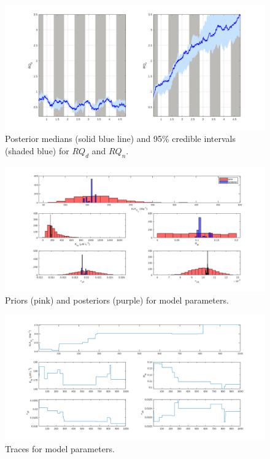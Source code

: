 \documentclass{ruthesis}
\begin{document}
\begin{figure}
	\centerline{\includegraphics[width=1.2\textwidth]{images_microalgae/plots_chris_offset_sigma/RQ_d_RQ_n}}
	\caption[.]{Posterior medians (solid blue line) and 95\% credible intervals (shaded blue) for $RQ_d$ and $RQ_n$.}
	\label{fig:micro_exp_offset_sigma_RQ_d_RQ_n}
\end{figure}



\begin{figure}
	\centerline{\includegraphics[width=1.3\textwidth]{images_microalgae/plots_chris_offset_sigma/modelparameters1}}
	\caption[.]{Priors (pink) and posteriors (purple) for model parameters.}
	\label{fig:micro_exp_offset_sigma_parameters_model}
\end{figure}

\begin{figure}
	\centerline{\includegraphics[width=1.3\textwidth]{images_microalgae/plots_chris_offset_sigma/modelparameters1_traces}}
	\caption[.]{Traces for model parameters.}
	\label{fig:micro_exp_offset_sigma_parameters_model2}
\end{figure}
\end{document}
